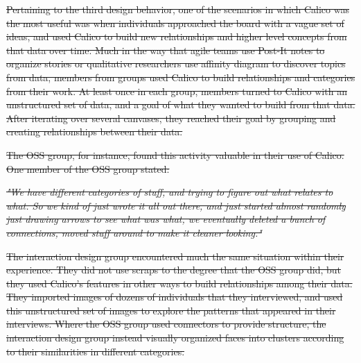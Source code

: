 \documentclass[12pt,fleqn]{ucithesis}
\providecommand{\DIFdeltex}[1]{{\protect\color{red}\sout{#1}}}                      %
\providecommand{\DIFdel}[1]{\texorpdfstring{\DIFdeltex{#1}}{}} %
\begin{document}
\DIFdel{Pertaining to the third design behavior, one of the scenarios in which Calico was the most useful was when individuals approached the board with a vague set of ideas, and used Calico to build new relationships and higher level concepts from that data over time. Much in the way that agile teams use Post-It notes to organize stories or qualitative researchers use affinity diagram to discover topics from data, members from groups used Calico to build relationships and categories from their work. At least once in each group, members turned to Calico with an unstructured set of data, and a goal of what they wanted to build from that data. After iterating over several canvases, they reached their goal by grouping and creating relationships between their data. 
}%

\DIFdel{The OSS group, for instance, found this activity valuable in their use of Calico. One member of the OSS group stated:
}%

\DIFdel{\emph{"We have different categories of stuff, and trying to figure out what relates to what. So we kind of just wrote it all out there, and just started almost randomly just drawing arrows to see what was what, we eventually deleted a bunch of connections, moved stuff around to make it cleaner looking."}
}%

\DIFdel{The interaction design group encountered much the same situation within their experience. They did not use scraps to the degree that the OSS group did, but they used Calico's features in other ways to build relationships among their data. They imported images of dozens of individuals that they interviewed, and used this unstructured set of images to explore the patterns that appeared in their interviews. Where the OSS group used connectors to provide structure, the interaction design group instead visually organized faces into clusters according to their similarities in different categories. 
}%
\end{document}

